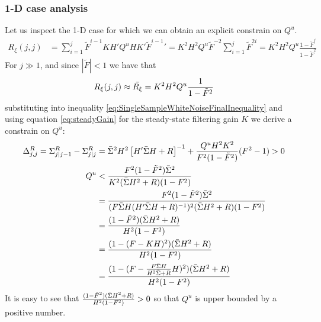 \documentclass[oneside,12pt]{article}
\begin{document}
\subsubsection*{1-D case analysis}
%
Let us inspect the 1-D case for which we can obtain an explicit constrain on $Q^u$.
%
\begin{equation}
    \begin{split}
         R_{\xi}(j,j) &= \sum_{i=1}^{j} \tilde{F}^{i-1} K H' Q^u H K' \tilde{F}^{i-1}'= K^2 H^2 Q^u \tilde{F}^{-2} \sum_{i=1}^{j} \tilde{F}^{2i} 
         = K^2 H^2 Q^u  \frac{1-\tilde{F}^j}{1-\tilde{F}^2}
    \end{split}
\end{equation}
%
For $j \gg 1$, and since $|\tilde{F}|<1$ we have that
%
\begin{equation}
    \begin{split}
         R_{\xi}(j,j) \approx \Bar{R_\xi} = K^2 H^2 Q^u  \frac{1}{1-\tilde{F}^2}
    \end{split}
\end{equation}
%
%
substituting into inequality \ref{eq:SingleSampleWhiteNoiseFinalInequality} and using equation \ref{eq:steadyGain} for the steady-state filtering gain $K$ we derive a constrain on $Q^u$:
%
%
\begin{equation}\label{eq:realFilteringVsSmoothingSingleSample02}
    \begin{split}
        \Delta^R_{j,j} = \Sigma^R_{j \mid j-1} - \Sigma^R_{j \mid j} &= \Bar{\Sigma}^2   H^2 \left[ H' \Bar{\Sigma} H + R\right]^{-1} + \frac{Q^u H^2 K^2 }{F^2(1-\tilde{F}^2)}(  F^2 - 1) > 0\\
        Q^u &< \frac{F^2(1-\tilde{F}^2) \Bar{\Sigma}^2}{ K^2(\Bar{\Sigma} H^2 + R)(1-F^2)}\\ 
        &= \frac{F^2(1-\tilde{F}^2) \Bar{\Sigma}^2}{ (F \Bar{\Sigma}H(H'\Bar{\Sigma}H+R)^{-1})^2(\Bar{\Sigma} H^2 + R)(1-F^2)}\\
        &= \frac{(1-\tilde{F}^2) (\Bar{\Sigma} H^2 + R)}{ H^2(1-F^2)}\\
        &= \frac{(1-(F - KH)^2) (\Bar{\Sigma} H^2 + R)}{ H^2(1-F^2)}\\
        &= \frac{(1-(F - \frac{F \Bar{\Sigma}H}{H^2 \Bar{\Sigma} + R}H)^2) (\Bar{\Sigma} H^2 + R)}{ H^2(1-F^2)}\\
    \end{split}
\end{equation}
%
%
It is easy to see that $\frac{(1-\tilde{F}^2) (\Bar{\Sigma} H^2 + R)}{ H^2(1-F^2)} > 0$ so that $Q^u$ is upper bounded by a positive number.\\\\
\end{document}
